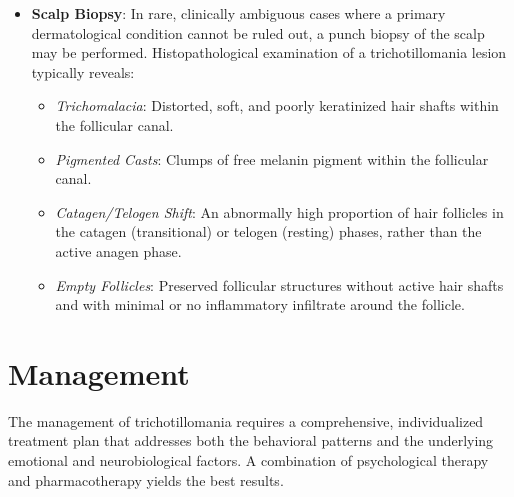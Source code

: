\begin{itemize}
\begin{itemize}
        \item ``Flame hairs'' and ``tulip hairs'' which are morphologically distorted, damaged hair remnants.
        \item Black dots (representing hair shafts broken at the scalp level) and yellow dots (representing empty follicular infundibula, sometimes containing sebum).
        \item The absence of diffuse scaling, scarring, or follicular plugging (which would suggest an inflammatory dermatosis).
    \end{itemize}
    \item \textbf{Scalp Biopsy}: In rare, clinically ambiguous cases where a primary dermatological condition cannot be ruled out, a punch biopsy of the scalp may be performed. Histopathological examination of a trichotillomania lesion typically reveals:
    \begin{itemize}
        \item \textit{Trichomalacia}: Distorted, soft, and poorly keratinized hair shafts within the follicular canal.
        \item \textit{Pigmented Casts}: Clumps of free melanin pigment within the follicular canal.
        \item \textit{Catagen/Telogen Shift}: An abnormally high proportion of hair follicles in the catagen (transitional) or telogen (resting) phases, rather than the active anagen phase.
        \item \textit{Empty Follicles}: Preserved follicular structures without active hair shafts and with minimal or no inflammatory infiltrate around the follicle.
    \end{itemize}
\end{itemize}

\section*{Management}
The management of trichotillomania requires a comprehensive, individualized treatment plan that addresses both the behavioral patterns and the underlying emotional and neurobiological factors. A combination of psychological therapy and pharmacotherapy yields the best results.

